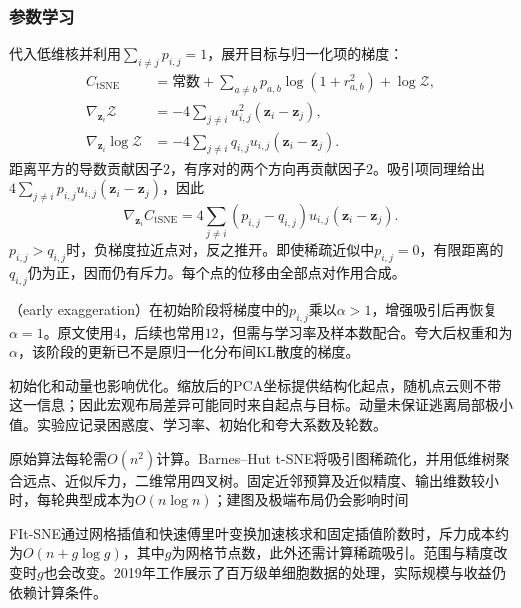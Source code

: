 \subsubsection{参数学习}

代入低维核并利用$\sum_{i\ne j}p_{i,j}=1$，展开目标与归一化项的梯度：
\begin{equation}
  \label{eq:dim-tsne-gradient-derivation}
  \begin{aligned}
    C_{\mathrm{tSNE}}
      &=\text{常数}
        +\sum_{a\ne b}p_{a,b}\log(1+r_{a,b}^2)
        +\log\mathcal{Z},\\
    \nabla_{\bm{z}_i}\mathcal{Z}
      &=-4\sum_{j\ne i}u_{i,j}^2(\bm{z}_i-\bm{z}_j),\\
    \nabla_{\bm{z}_i}\log\mathcal{Z}
      &=-4\sum_{j\ne i}q_{i,j}u_{i,j}(\bm{z}_i-\bm{z}_j).
  \end{aligned}
\end{equation}
距离平方的导数贡献因子$2$，有序对的两个方向再贡献因子$2$。吸引项同理给出$4\sum_{j\ne i}p_{i,j}u_{i,j}(\bm{z}_i-\bm{z}_j)$，因此
\begin{equation}
  \label{eq:dim-tsne-gradient}
  \nabla_{\bm{z}_i}C_{\mathrm{tSNE}}
    =4\sum_{j\ne i}(p_{i,j}-q_{i,j})u_{i,j}
      (\bm{z}_i-\bm{z}_j).
\end{equation}
$p_{i,j}>q_{i,j}$时，负梯度拉近点对，反之推开。即使稀疏近似中$p_{i,j}=0$，有限距离的$q_{i,j}$仍为正，因而仍有斥力。每个点的位移由全部点对作用合成。

（early exaggeration）在初始阶段将梯度中的$p_{i,j}$乘以$\alpha>1$，增强吸引后再恢复$\alpha=1$。原文使用$4$，后续也常用$12$，但需与学习率及样本数配合。夸大后权重和为$\alpha$，该阶段的更新已不是原归一化分布间KL散度的梯度。

初始化和动量也影响优化。缩放后的PCA坐标提供结构化起点，随机点云则不带这一信息；因此宏观布局差异可能同时来自起点与目标。动量未保证逃离局部极小值。实验应记录困惑度、学习率、初始化和夸大系数及轮数。

原始算法每轮需$O(n^2)$计算。Barnes--Hut t-SNE将吸引图稀疏化，并用低维树聚合远点、近似斥力，二维常用四叉树。固定近邻预算及近似精度、输出维数较小时，每轮典型成本为$O(n\log n)$；建图及极端布局仍会影响时间

FIt-SNE通过网格插值和快速傅里叶变换加速核求和固定插值阶数时，斥力成本约为$O(n+g\log g)$，其中$g$为网格节点数，此外还需计算稀疏吸引。范围与精度改变时$g$也会改变。2019年工作展示了百万级单细胞数据的处理，实际规模与收益仍依赖计算条件。

